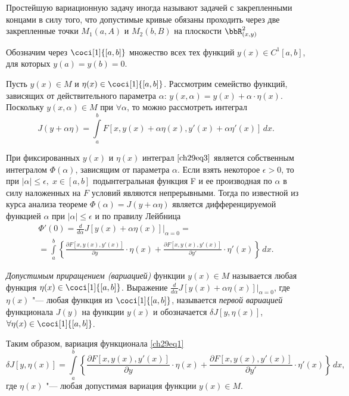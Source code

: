 Простейшую вариационную задачу иногда называют задачей с закрепленными концами в силу того, что допустимые кривые обязаны проходить через две закрепленные точки $M_1(a,A)$ и $M_2(b,B)$ на плоскости $\bbR^2_{(x,y)}$

Обозначим через $\coci[1]{[a,b]}$ множество всех тех функций $y(x)\in C^1[a,b]$, для которых $y(a)=y(b)=0$.

Пусть $y(x)\in M$ и $\eta (x)\in \coci[1]{[a,b]}$. Рассмотрим семейство функций, зависящих от действительного параметра $\alpha$: $y(x,\alpha)=y(x)+\alpha\cdot\eta(x)$. Поскольку $y(x,\alpha)\in M$ при $\forall\alpha$, то можно рассмотреть интеграл 
\begin{equation} \label{ch29eq3}
J(y+\alpha\eta)=\int\limits_a^b F[x,y(x)+\alpha\eta(x),y'(x)+\alpha\eta'(x)]\,dx.
\end{equation}

При фиксированных $y(x)$ и $\eta(x)$ интеграл $\eqref{ch29eq3}$ является собственным интегралом $\Phi(\alpha)$, зависящим от параметра $\alpha$. Если взять некоторое $\epsilon>0$, то при $|\alpha|\leq\epsilon,\;x\in[a,b]$ подынтегральная функция F и ее производная по $\alpha$ в силу наложенных на $F$ условий являются непрерывными. Тогда по известной из курса анализа теореме $\Phi(\alpha)=J(y+\alpha\eta)$ является дифференцируемой функцией $\alpha$ при $|\alpha|\leq \epsilon$ и по правилу Лейбница
\begin{multline*}
\Phi'(0)=\frac{d}{d\alpha}J[y(x)+\alpha\eta(x)]\biggr|_{\alpha=0}=\\=\int\limits_a^b\left\{ \frac{\partial F[x,y(x),y'(x)]}{\partial y}\cdot \eta(x)+\frac{\partial F[x,y(x),y'(x)]}{\partial y'}\cdot \eta'(x)\right\}\,dx.
\end{multline*}

\begin{defn}
\textit{Допустимым приращением (вариацией)} функции $y(x)\in M$ называется любая функция $\eta (x)\in \coci[1]{[a,b]}$. Выражение $\frac{d}{d\alpha}J[y(x)+\alpha\eta(x)]\bigr|_{\alpha=0}$, где $\eta(x)$ "--- любая функция из $\coci[1]{[a,b]}$,  называется \textit{первой вариацией} функционала $J(y)$ на функции $y(x)$ и обозначается $\delta J[y,\eta(x)]$, $\forall\eta(x)\in\coci[1]{[a,b]}$.
\end{defn}

Таким образом, вариация функционала \eqref{ch29eq1}
\begin{equation} \label{ch29eq4}
\delta J[y,\eta(x)]=\int\limits_a^b\left\{\frac{\partial F[x,y(x),y'(x)]}{\partial y}\cdot\eta(x) + \frac{\partial F[x,y(x),y'(x)]}{\partial y'}\cdot \eta'(x)\right\}\,dx,
\end{equation}
где $\eta(x)$ "--- любая допустимая вариация функции  $y(x)\in M$.

